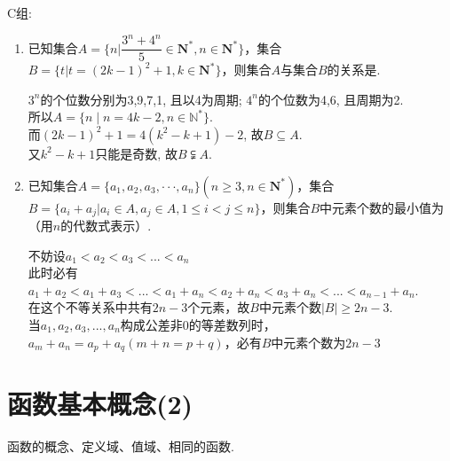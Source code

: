 C组: 
\begin{enumerate}
\item 已知集合$A = \{n | \dfrac{3^n + 4^n}{5} \in \mathbf{N^*}, n \in \mathbf{N^*} \}$，集合$B =\{t | t = (2k-1)^2+1, k \in \mathbf{N^*} \}$，则集合$A$与集合$B$的关系是.

\begin{jieda}
$3^n$的个位数分别为3,9,7,1, 且以4为周期; $4^n$的个位数为4,6, 且周期为2.\\
所以$A=\{n\mid n=4k-2,n\in\mathbb{N^*}\}$.\\
而$(2k-1)^2+1=4(k^2-k+1)-2$, 故$B\subseteq A$.\\
又$k^2-k+1$只能是奇数, 故$B\subsetneqq A$.
\end{jieda}

\begin{vspace_}
\vsp[6]
\end{vspace_}

\item 已知集合$A = \{a_1, a_2, a_3, \cdot \cdot \cdot, a_n \} ( n \geq 3, n \in \mathbf{N^*})$，集合$B =\{a_i + a_j | a_i \in A, a_j \in A, 1 \leq i < j \leq n \}$，则集合$B$中元素个数的最小值为（用$n$的代数式表示）.

\begin{jieda}
不妨设$a_1 < a_2 < a_3 < ... < a_n$\\
此时必有$a_1+a_2 < a_1 + a_3 < ... < a_1 + a_n < a_2 + a_n < a_3 + a_n < ... < a_{n-1} + a_n$.\\
在这个不等关系中共有$2n-3$个元素，故$B$中元素个数$|B| \geq 2n-3$.\\
当$a_1, a_2, a_3, ..., a_n$构成公差非0的等差数列时，$a_m + a_n = a_p + a_q (m+n = p+q)$，必有$B$中元素个数为$2n-3$
\end{jieda} 
\end{enumerate}
\clearpage

\section{函数基本概念(2)} %
\zsd 函数的概念、定义域、值域、相同的函数. 

